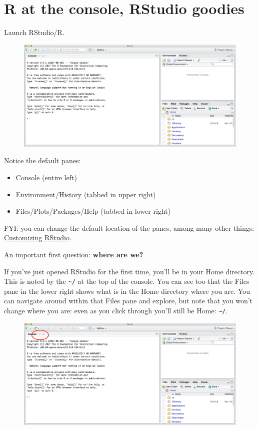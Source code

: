\documentclass[]{book}
\providecommand{\tightlist}{%
  \setlength{\itemsep}{0pt}\setlength{\parskip}{0pt}}
\theoremstyle{definition}
\theoremstyle{definition}
\theoremstyle{definition}
\theoremstyle{remark}
\begin{document}
\section{R at the console, RStudio
goodies}\label{r-at-the-console-rstudio-goodies}

Launch RStudio/R.

\begin{figure}
\centering
\includegraphics{img/RStudio_IDE.png}
\caption{}
\end{figure}

Notice the default panes:

\begin{itemize}
\tightlist
\item
  Console (entire left)
\item
  Environment/History (tabbed in upper right)
\item
  Files/Plots/Packages/Help (tabbed in lower right)
\end{itemize}

FYI: you can change the default location of the panes, among many other
things:
\href{https://support.rstudio.com/hc/en-us/articles/200549016-Customizing-RStudio}{Customizing
RStudio}.

An important first question: \textbf{where are we?}

If you've just opened RStudio for the first time, you'll be in your Home
directory. This is noted by the \texttt{\textasciitilde{}/} at the top
of the console. You can see too that the Files pane in the lower right
shows what is in the Home directory where you are. You can navigate
around within that Files pane and explore, but note that you won't
change where you are: even as you click through you'll still be Home:
\texttt{\textasciitilde{}/}.

\begin{figure}
\centering
\includegraphics{img/RStudio_IDE_homedir.png}
\caption{}
\end{figure}
\end{document}
